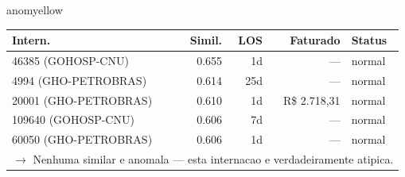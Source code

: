 \documentclass[a4paper,10pt]{article}
\begin{document}
\begin{anomalycard}[Internacao 9522 | GHO-REALGRANDEZA | MODERADO (z=2.21)]{anomyellow}
\begin{tabular}{l r r r l}\toprule\textbf{Intern.} & \textbf{Simil.} & \textbf{LOS} & \textbf{Faturado} & \textbf{Status} \\\midrule
46385 (GOHOSP-CNU) & 0.655 & 1d & --- & \textcolor{jcubeblue}{normal} \\
4994 (GHO-PETROBRAS) & 0.614 & 25d & --- & \textcolor{jcubeblue}{normal} \\
20001 (GHO-PETROBRAS) & 0.610 & 1d & R\$ 2.718,31 & \textcolor{jcubeblue}{normal} \\
109640 (GOHOSP-CNU) & 0.606 & 7d & --- & \textcolor{jcubeblue}{normal} \\
60050 (GHO-PETROBRAS) & 0.606 & 1d & --- & \textcolor{jcubeblue}{normal} \\
\multicolumn{5}{l}{\textcolor{jcubeblue}{\small $\rightarrow$ Nenhuma similar e anomala --- esta internacao e verdadeiramente atipica.}} \\
\bottomrule\end{tabular}



\end{anomalycard}
\end{document}
